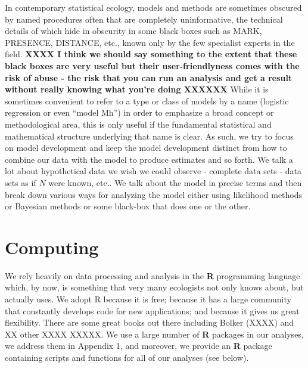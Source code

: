 In contemporary statistical ecology, models and methods are sometimes
obscured by named procedures often that are completely uninformative,
the technical details of which hide in obscurity in some black boxes
such as MARK, PRESENCE, DISTANCE, etc., known only by the few
specialist experts in the field.  {\bf XXXX I think we should say
  something to the extent that these black boxes are very useful but
  their user-friendlyness comes with the risk of abuse - the risk that
  you can run an analysis and get a result without really knowing what
  you're doing XXXXXX}  While it is sometimes convenient to refer to a
type or class of models by a name (logistic regression or even ``model
Mh'') in order to emphasize a broad concept or methodological area,
this is only useful if the fundamental statistical and mathematical
structure underlying that name is clear. As such, we try to focus on
model development and keep the model development distinct from how to
combine our data with the model to produce estimates and so forth. We
talk a lot about hypothetical data we wish we could observe - complete
data sets - data sets as if $N$ were known, etc.. We talk about the
model in precise terms and then break down various ways for analyzing
the model either using likelihood methods or Bayesian methods or some
black-box that does one or the other.



















\section*{Computing}

We rely heavily on data processing and analysis in the {\bf R}
programming language which, by now, is something that very many
ecologists not only knows about, but actually uses. We adopt R because
it is free; because it has a large community that constantly develops
code for new applications; and because it gives us great flexibility.
There are some great books out there including Bolker (XXXX) and XX
other XXXX XXXXX. We use a large number of {\bf R} packages in our
analyses, we address them in Appendix 1, and moreover, we provide an
{\bf R} package containing scripts and functions for all of our
analyses (see below).

